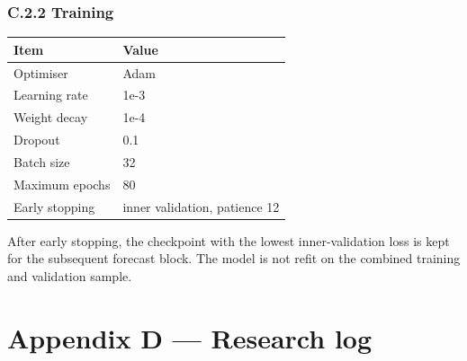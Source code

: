 \documentclass[
  british,
  12pt,
  oneside]{book}
\newcounter{none} %
\begin{document}
{\subsection*{C.2.2 Training}\label{c.2.2-training}

{\def\LTcaptype{none} %
\begin{longtable}[]{@{}ll@{}}
\toprule\noalign{}
Item & Value \\
\midrule\noalign{}
\endhead
\bottomrule\noalign{}
\endlastfoot
Optimiser & Adam \\
Learning rate & 1e-3 \\
Weight decay & 1e-4 \\
Dropout & 0.1 \\
Batch size & 32 \\
Maximum epochs & 80 \\
Early stopping & inner validation, patience 12 \\
\end{longtable}
}

After early stopping, the checkpoint with the lowest inner-validation loss is
kept for the subsequent forecast block. The model is not refit on the combined
training and validation sample.

\chapter*{Appendix D --- Research log}\label{appendix-d-research-log}


}
\end{document}
